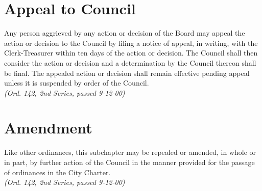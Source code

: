 \section{Appeal to Council}
Any person aggrieved by any action or decision of the Board may appeal the action or decision to the Council by filing a notice of appeal, in writing, with the Clerk-Treasurer within ten days of the action or decision.  The Council shall then consider the action or decision and a determination by the Council thereon shall be final.  The appealed action or decision shall remain effective pending appeal unless it is suspended by order of the Council.\\
\emph{(Ord. 142, 2nd Series, passed 9-12-00)}
\section{Amendment}
Like other ordinances, this subchapter may be repealed or amended, in whole or in part, by further action of the Council in the manner provided for the passage of ordinances in the City Charter.\\
\emph{(Ord. 142, 2nd Series, passed 9-12-00)}
